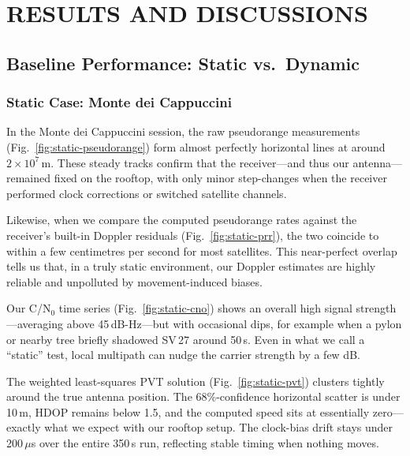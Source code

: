 
\section{RESULTS AND DISCUSSIONS} \label{sec:results}

    \subsection{Baseline Performance: Static vs.\ Dynamic}
    

        \subsubsection{Static Case: Monte dei Cappuccini}
        
            In the Monte dei Cappuccini session, the raw pseudorange measurements (Fig.~\ref{fig:static-pseudorange}) form almost perfectly horizontal lines at around $2\times10^{7}$\,m. 
            These steady tracks confirm that the receiver—and thus our antenna—remained fixed on the rooftop, with only minor step-changes when the receiver performed clock corrections or switched satellite channels.

            Likewise, when we compare the computed pseudorange rates against the receiver's built-in Doppler residuals (Fig.~\ref{fig:static-prr}), the two coincide to within a few centimetres per second for most satellites. 
            This near-perfect overlap tells us that, in a truly static environment, our Doppler estimates are highly reliable and unpolluted by movement-induced biases.

            Our C/N$_0$ time series (Fig.~\ref{fig:static-cno}) shows an overall high signal strength—averaging above 45\,dB-Hz—but with occasional dips, for example when a pylon or nearby tree briefly shadowed SV\,27 around 50\,s. 
            Even in what we call a “static” test, local multipath can nudge the carrier strength by a few dB.

            The weighted least-squares PVT solution (Fig.~\ref{fig:static-pvt}) clusters tightly around the true antenna position. 
            The 68\%-confidence horizontal scatter is under 10\,m, HDOP remains below 1.5, and the computed speed sits at essentially zero—exactly what we expect with our rooftop setup. 
            The clock-bias drift stays under 200\,$\mu$s over the entire 350\,s run, reflecting stable timing when nothing moves.

